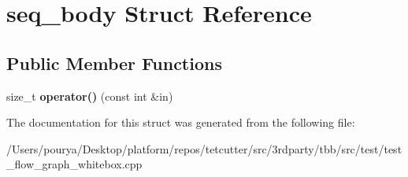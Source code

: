 \hypertarget{structseq__body}{}\section{seq\+\_\+body Struct Reference}
\label{structseq__body}
\subsection*{Public Member Functions}
\begin{DoxyCompactItemize}
\item 
\hypertarget{structseq__body_a22c5cca14bb05ed8fa9de2ffe936fa81}{}size\+\_\+t {\bfseries operator()} (const int \&in)\label{structseq__body_a22c5cca14bb05ed8fa9de2ffe936fa81}

\end{DoxyCompactItemize}


The documentation for this struct was generated from the following file\+:\begin{DoxyCompactItemize}
\item 
/\+Users/pourya/\+Desktop/platform/repos/tetcutter/src/3rdparty/tbb/src/test/test\+\_\+flow\+\_\+graph\+\_\+whitebox.\+cpp\end{DoxyCompactItemize}
